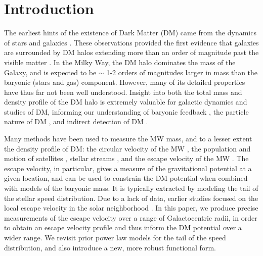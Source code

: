 \section{Introduction} \label{sec:intro}
The earliest hints of the existence of Dark Matter (DM) came from the dynamics of stars and galaxies \citep{zwicky:1933,rubin:1970}. 
These observations provided the first evidence that galaxies are surrounded by DM halos extending more than an order of magnitude past the visible matter \citep{1974ApJ...193L...1O,1974Natur.250..309E}. In the Milky Way, the DM halo dominates the mass of the Galaxy, and is expected to be $\sim$ 1-2 orders of magnitudes larger in mass than the baryonic (stars and gas) component. However, many of its detailed properties have thus far not been well understood. 
Insight into both the total mass and density profile of the DM halo is extremely valuable for galactic dynamics and studies of DM, informing our understanding of baryonic feedback \citep{2016MNRAS.456.3542T,2020MNRAS.497.2393L}, the particle nature of DM \citep{Spergel:1999mh,Tulin:2017ara,Lisanti:2018qam,Nadler:2019zrb,DES:2020fxi}, and indirect detection of DM \citep{Cirelli:2010xx,Slatyer:2017sev,Rinchiuso:2020skh}.  


Many methods have been used to measure the MW mass, and to a lesser extent the density profile of DM: the circular velocity of the MW \citep{nesti:2013, deSalas:2019, eilers:2019,Ou:2023,2023arXiv230900048J,2023ApJ...942...12W,2023ApJ...946...73Z}, the population and motion of satellites \citep{barber:2014, cautun:2014, patel:2018, callingham:2019, sohn:2018, watkins:2019, fritz:2020}, stellar streams \citep{gibbons:2014, kupper:2015, dierickx:2017, Vasiliev:2021}, and the escape velocity of the MW \citep{Piffl2014, williams:2017, banik:2018, Monari2018, deason:2019, Koppelman2021, Necib2022, Prudil:2022}. The escape velocity, in particular, gives a measure of the gravitational potential at a given location, and can be used to constrain the DM potential when combined with models of the baryonic mass. It is typically extracted by modeling the tail of the stellar speed distribution. Due to a lack of data, earlier studies focused on the local escape velocity in the solar neighborhood \citep{Leonard1990,smith:2007}. 
In this paper, we produce precise measurements of the escape velocity over a range of Galactocentric radii, in order to obtain an escape velocity profile and thus inform the DM potential over a wider range. We revisit prior power law models for the tail of the speed distribution, and also introduce a new, more robust functional form. 


